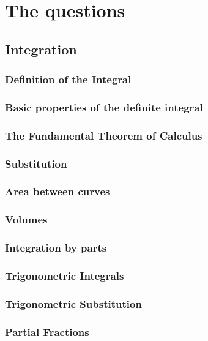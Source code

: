 \documentclass[12pt,letterpaper, openany]{book}
\begin{document}
\tableofcontents

\mainmatter

\part{The questions}


\chapter{Integration}
\section{Definition of the Integral}

\section{Basic properties of the definite integral}

\section{The Fundamental Theorem of Calculus}

\section{Substitution}

\section{Area between curves}

\section{Volumes}

\section{Integration by parts}

\section{Trigonometric Integrals}

\section{Trigonometric Substitution}

\section{Partial Fractions}

\end{document}
